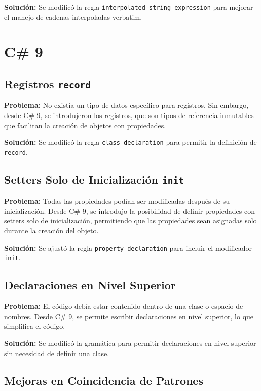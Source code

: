 \textbf{Solución:} Se modificó la regla \texttt{interpolated\_string\_expression} para mejorar el manejo de cadenas interpoladas verbatim.



\section*{C\# 9}

\subsection*{Registros \texttt{record}}

\textbf{Problema:} No existía un tipo de datos específico para registros. Sin embargo, desde C\# 9, se introdujeron los registros, que son tipos de referencia inmutables que facilitan la creación de objetos con propiedades.

\textbf{Solución:} Se modificó la regla \texttt{class\_declaration} para permitir la definición de \texttt{record}.

\subsection*{Setters Solo de Inicialización \texttt{init}}

\textbf{Problema:} Todas las propiedades podían ser modificadas después de su inicialización. Desde C\# 9, se introdujo la posibilidad de definir propiedades con setters solo de inicialización, permitiendo que las propiedades sean asignadas solo durante la creación del objeto.

\textbf{Solución:} Se ajustó la regla \texttt{property\_declaration} para incluir el modificador \texttt{init}.

\subsection*{Declaraciones en Nivel Superior}

\textbf{Problema:} El código debía estar contenido dentro de una clase o espacio de nombres. Desde C\# 9, se permite escribir declaraciones en nivel superior, lo que simplifica el código.

\textbf{Solución:} Se modificó la gramática para permitir declaraciones en nivel superior sin necesidad de definir una clase.

\subsection*{Mejoras en Coincidencia de Patrones}

